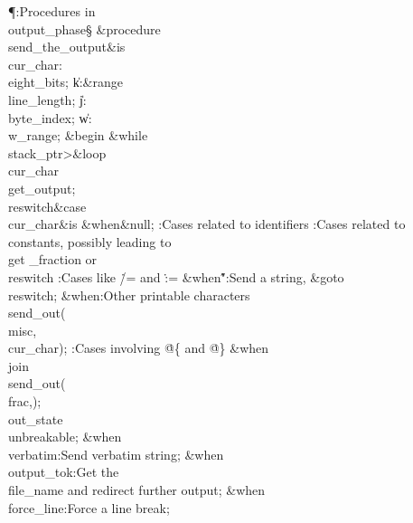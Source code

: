 \Y\P\?\4:Procedures in \\{output\_phase}\X\mathrel{+}\S\?\6
\&{procedure}\8\1\\{send\_the\_output}\2\8\&{is}\8\1\6
\\{cur\_char}\?:\?\\{eight\_bits};\6
\|k\?:\?\8\&{range}\?\to\?\\{line\_length};\6
\|j\?:\?\\{byte\_index};\6
\|w\?:\?\\{w\_range};\6
\4\&{begin}\6
\1\&{while}\8\\{stack\_ptr}\?>\8\&{loop}\6
\\{cur\_char}\?\K\?\\{get\_output};\6
\4\BL\\{reswitch}\EL\8\&{case}\1\8\\{cur\_char}\1\8\&{is}\8\6
\4\&{when}\KR\8\&{null};\6
\hbox{\4}:Cases related to identifiers\X\6
\hbox{\4}:Cases related to constants, possibly leading to \\{get%
\_fraction} or \\{reswitch}\X\6
\hbox{\4}:Cases like \.{/=} and \.{:=}\X\6
\4\&{when}\8\H{"}\KR\8:Send a string, \&{goto}\8\\{reswitch}\X;\6
\4\&{when}\?\8:Other printable characters\X\?\KR\8\\{send\_out}\?\1(\?%
\\{misc}\?,\?\\{cur\_char}\?\2)\?;\6
\hbox{\4}:Cases involving \.{@\{} and \.{@\}}\X\6
\4\&{when}\8\\{join}\KR\8\\{send\_out}\?\1(\?\\{frac}\?,\?\2)\?;\5
\\{out\_state}\?\K\?\\{unbreakable};\6
\4\&{when}\8\\{verbatim}\KR\8:Send verbatim string\X;\6
\4\&{when}\8\\{output\_tok}\KR\8:Get the \\{file\_name} and redirect
further output\X;\6
\4\&{when}\8\\{force\_line}\KR\8:Force a line break\X;\6
